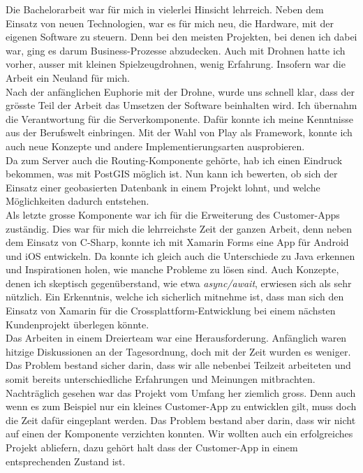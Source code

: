 Die Bachelorarbeit war für mich in vielerlei Hinsicht lehrreich. 
Neben dem Einsatz von neuen Technologien, war es für mich neu, die Hardware, mit der eigenen Software zu steuern. Denn bei den meisten Projekten, bei denen ich dabei war, ging es darum Business-Prozesse abzudecken. Auch mit Drohnen hatte ich vorher, ausser mit kleinen Spielzeugdrohnen, wenig Erfahrung. Insofern war die Arbeit ein Neuland für mich.\\

Nach der anfänglichen Euphorie mit der Drohne, wurde uns schnell klar, dass der grösste Teil der Arbeit das Umsetzen der Software beinhalten wird.
Ich übernahm die Verantwortung für die Serverkomponente. Dafür konnte ich meine Kenntnisse aus der Berufswelt einbringen. Mit der Wahl von Play als Framework, konnte ich auch neue Konzepte und andere Implementierungsarten ausprobieren. \\

Da zum Server auch die Routing-Komponente gehörte, hab ich einen Eindruck bekommen, was mit PostGIS möglich ist. Nun kann ich bewerten, ob sich der Einsatz einer geobasierten Datenbank in einem Projekt lohnt, und welche Möglichkeiten dadurch entstehen.\\

Als letzte grosse Komponente war ich für die Erweiterung des Customer-Apps zuständig. Dies war für mich die lehrreichste Zeit der ganzen Arbeit, denn neben dem Einsatz von C-Sharp, konnte ich mit Xamarin Forms eine App für Android und iOS entwickeln. Da konnte ich gleich auch die Unterschiede zu Java erkennen und Inspirationen holen, wie manche Probleme zu lösen sind.
Auch Konzepte, denen ich skeptisch gegenüberstand, wie etwa \textit{async/await}, erwiesen sich als sehr nützlich. Ein Erkenntnis, welche ich sicherlich mitnehme ist, dass man sich den Einsatz von Xamarin für die Crossplattform-Entwicklung bei einem nächsten Kundenprojekt überlegen könnte.\\

Das Arbeiten in einem Dreierteam war eine Herausforderung. Anfänglich waren hitzige Diskussionen an der Tagesordnung, doch mit der Zeit wurden es weniger. Das Problem bestand sicher darin, dass wir alle nebenbei Teilzeit arbeiteten und somit bereits unterschiedliche Erfahrungen und Meinungen mitbrachten.  
\\

Nachträglich gesehen war das Projekt vom Umfang her ziemlich gross. Denn auch wenn es zum Beispiel nur ein kleines Customer-App zu entwicklen gilt, muss doch die Zeit dafür eingeplant werden. Das Problem bestand aber darin, dass wir nicht auf einen der Komponente verzichten konnten. Wir wollten auch ein erfolgreiches Projekt abliefern, dazu gehört halt dass der Customer-App in einem entsprechenden Zustand ist.
\\

